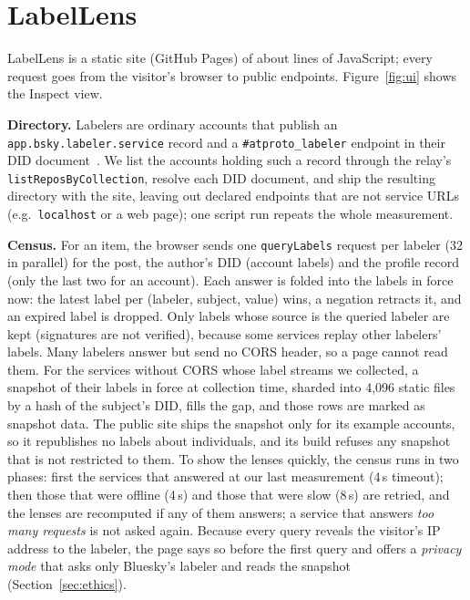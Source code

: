\section{LabelLens}
\label{sec:system}
LabelLens is a static site (GitHub Pages) of about \codeLines lines of JavaScript; every request goes from the visitor's browser to public endpoints. Figure~\ref{fig:ui} shows the Inspect view.

\textbf{Directory.} Labelers are ordinary accounts that publish an \texttt{app.bsky.labeler.service} record and a \texttt{\#atproto\_labeler} endpoint in their DID document~\cite{ATProto_labels}. We list the accounts holding such a record through the relay's \texttt{listReposByCollection}, resolve each DID document, and ship the resulting directory with the site, leaving out \labInvalidEndpoint declared endpoints that are not service URLs (e.g.\ \texttt{localhost} or a web page); one script run repeats the whole measurement.

\textbf{Census.} For an item, the browser sends one \texttt{queryLabels} request per labeler (32 in parallel) for the post, the author's DID (account labels) and the profile record (only the last two for an account). Each answer is folded into the labels in force now: the latest label per (labeler, subject, value) wins, a negation retracts it, and an expired label is dropped. Only labels whose source is the queried labeler are kept (signatures are not verified), because some services replay other labelers' labels. Many labelers answer but send no CORS header, so a page cannot read them. For the \snapSources services without CORS whose label streams we collected, a snapshot of their labels in force at collection time, sharded into 4{,}096 static files by a hash of the subject's DID, fills the gap, and those rows are marked as snapshot data. The public site ships the snapshot only for its example accounts, so it republishes no labels about individuals, and its build refuses any snapshot that is not restricted to them. To show the lenses quickly, the census runs in two phases: first the services that answered at our last measurement (4\,s timeout); then those that were offline (4\,s) and those that were slow (8\,s) are retried, and the lenses are recomputed if any of them answers; a service that answers \emph{too many requests} is not asked again. Because every query reveals the visitor's IP address to the labeler, the page says so before the first query and offers a \emph{privacy mode} that asks only Bluesky's labeler and reads the snapshot (Section~\ref{sec:ethics}).

